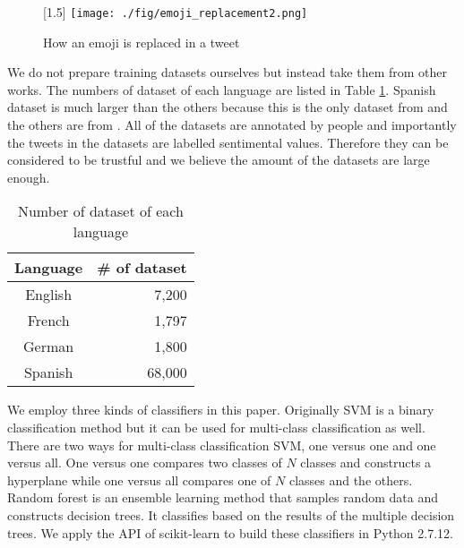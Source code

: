 \documentclass[twocolumn]{article}
\begin{document}
\begin{figure}
	\centering
	\scalebox{1.5}[1.5]{
	\texttt{[image: ./fig/emoji\_replacement2.png]}
	}
	\caption{How an emoji is replaced in a tweet}
	\label{fig:emoji_replacement}
\end{figure}

We do not prepare training datasets ourselves but instead take them from other works.
The numbers of dataset of each language are listed in Table \ref{tab:dataset}.
Spanish dataset is much larger than the others because this is the only dataset from \cite{dataset_spanish} and the others are from \cite{dataset}.
All of the datasets are annotated by people and importantly the tweets in the datasets are labelled sentimental values.
Therefore they can be considered to be trustful and we believe the amount of the datasets are large enough.

\begin{table}[ht]
	\caption{Number of dataset of each language}
	\centering
	\begin{tabular}{|c|r|} \hline
	Language & \# of dataset \\ \hline \hline
	English & 7,200  \\ \hline
	French & 1,797  \\ \hline
	German & 1,800  \\ \hline
	Spanish & 68,000  \\ \hline
	\end{tabular}
	\label{tab:dataset}
\end{table}

We employ three kinds of classifiers in this paper.
Originally SVM is a binary classification method but it can be used for multi-class classification as well.
There are two ways for multi-class classification SVM, one versus one and one versus all.
One versus one compares two classes of $N$ classes and constructs a hyperplane while one versus all compares one of $N$ classes and the others.
Random forest is an ensemble learning method that samples random data and constructs decision trees.
It classifies based on the results of the multiple decision trees. 
We apply the API of scikit-learn \cite{scikit} to build these classifiers in Python 2.7.12.
\end{document}

